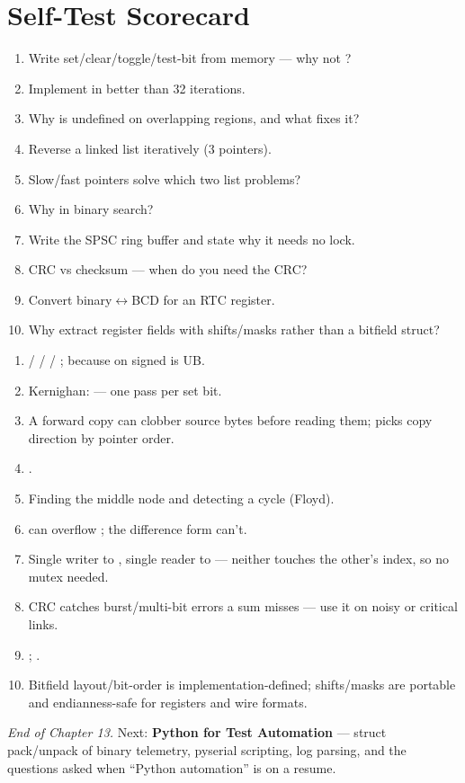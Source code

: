 \section{Self-Test Scorecard}
\begin{scorecard}
\begin{enumerate}
\item Write set/clear/toggle/test-bit from memory --- why  not
  ?
\item Implement  in better than 32 iterations.
\item Why is  undefined on overlapping regions, and what fixes
  it?
\item Reverse a linked list iteratively (3 pointers).
\item Slow/fast pointers solve which two list problems?
\item Why  in binary search?
\item Write the SPSC ring buffer and state why it needs no lock.
\item CRC vs checksum --- when do you need the CRC?
\item Convert binary$\leftrightarrow$BCD for an RTC register.
\item Why extract register fields with shifts/masks rather than a bitfield
  struct?
\end{enumerate}
\end{scorecard}

\begin{answerkey}
\begin{enumerate}
\item {} / \code{\&=\textasciitilde} / \code{\^{}=} /
  ;  because  on signed  is UB.
\item Kernighan:  --- one pass per set bit.
\item A forward copy can clobber source bytes before reading them; 
  picks copy direction by pointer order.
\item {}.
\item Finding the middle node and detecting a cycle (Floyd).
\item {} can overflow ; the difference form can't.
\item Single writer to , single reader to  --- neither
  touches the other's index, so no mutex needed.
\item CRC catches burst/multi-bit errors a sum misses --- use it on noisy or
  critical links.
\item {}; .
\item Bitfield layout/bit-order is implementation-defined; shifts/masks are
  portable and endianness-safe for registers and wire formats.
\end{enumerate}
\end{answerkey}

\begin{partnote}
\emph{End of Chapter 13.} Next: \textbf{Python for Test Automation} --- struct
pack/unpack of binary telemetry, pyserial scripting, log parsing, and the
questions asked when ``Python automation'' is on a resume.
\end{partnote}
